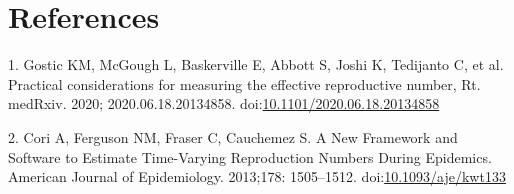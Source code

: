 \documentclass[
]{article}
\begin{document}
\hypertarget{references}{%
\section*{References}\label{references}}

\hypertarget{refs}{}
\leavevmode\hypertarget{ref-gosticPracticalConsiderationsMeasuring2020}{}%
1. Gostic KM, McGough L, Baskerville E, Abbott S, Joshi K, Tedijanto C,
et al. Practical considerations for measuring the effective reproductive
number, Rt. medRxiv. 2020; 2020.06.18.20134858.
doi:\href{https://doi.org/10.1101/2020.06.18.20134858}{10.1101/2020.06.18.20134858}

\leavevmode\hypertarget{ref-coriNewFrameworkSoftware2013}{}%
2. Cori A, Ferguson NM, Fraser C, Cauchemez S. A New Framework and
Software to Estimate Time-Varying Reproduction Numbers During Epidemics.
American Journal of Epidemiology. 2013;178: 1505--1512.
doi:\href{https://doi.org/10.1093/aje/kwt133}{10.1093/aje/kwt133}
\end{document}
